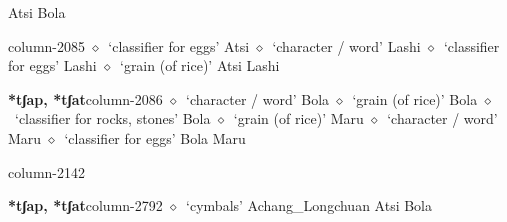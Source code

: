          Atsi 
\hspace{1ex}
         Bola 
  \item {\footnotesize \textbf{}}{\tiny column-2085}
         $\diamond$~`classifier for eggs'
         Atsi 
\hspace{1ex}
         $\diamond$~`character / word'
         Lashi 
\hspace{1ex}
         $\diamond$~`classifier for eggs'
         Lashi 
\hspace{1ex}
         $\diamond$~`grain (of rice)'
         Atsi 
\hspace{1ex}
         Lashi 
  \item {\footnotesize \textbf{*tʃap, *tʃat}}{\tiny column-2086}
         $\diamond$~`character / word'
         Bola 
\hspace{1ex}
         $\diamond$~`grain (of rice)'
         Bola 
\hspace{1ex}
         $\diamond$~`classifier for rocks, stones'
         Bola 
\hspace{1ex}
         $\diamond$~`grain (of rice)'
         Maru 
\hspace{1ex}
         $\diamond$~`character / word'
         Maru 
\hspace{1ex}
         $\diamond$~`classifier for eggs'
         Bola 
\hspace{1ex}
         Maru 
  \item {\footnotesize \textbf{}}{\tiny column-2142}
  \item {\footnotesize \textbf{*tʃap, *tʃat}}{\tiny column-2792}
         $\diamond$~`cymbals'
         Achang\_Longchuan 
\hspace{1ex}
         Atsi 
\hspace{1ex}
         Bola 
\hspace{1ex}
